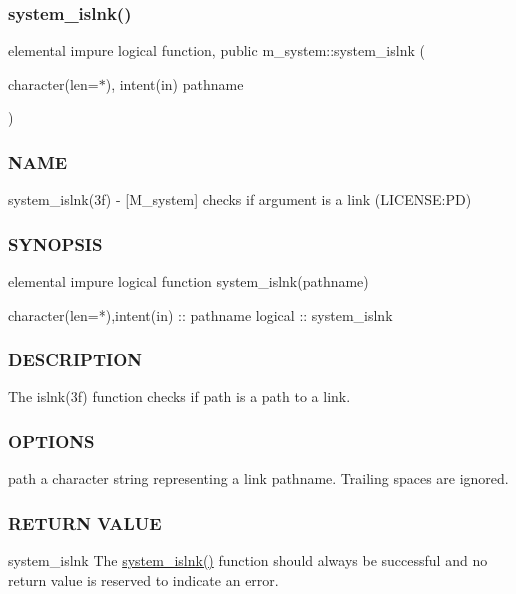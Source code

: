 \subsubsection{\texorpdfstring{system\+\_\+islnk()}{system\_islnk()}}
{\footnotesize\ttfamily elemental impure logical function, public m\+\_\+system\+::system\+\_\+islnk (\begin{DoxyParamCaption}\item[{character(len=$\ast$), intent(in)}]{pathname }\end{DoxyParamCaption})}



\subsubsection*{N\+A\+ME}

system\+\_\+islnk(3f) -\/ \mbox{[}M\+\_\+system\mbox{]} checks if argument is a link (L\+I\+C\+E\+N\+SE\+:PD) 

\subsubsection*{S\+Y\+N\+O\+P\+S\+IS}

\begin{DoxyVerb}elemental impure logical function system_islnk(pathname)

character(len=*),intent(in) :: pathname
logical                     :: system_islnk
\end{DoxyVerb}


\subsubsection*{D\+E\+S\+C\+R\+I\+P\+T\+I\+ON}

The islnk(3f) function checks if path is a path to a link.

\subsubsection*{O\+P\+T\+I\+O\+NS}

path a character string representing a link pathname. Trailing spaces are ignored.

\subsubsection*{R\+E\+T\+U\+RN V\+A\+L\+UE}

system\+\_\+islnk The \mbox{\hyperlink{namespacem__system_a268d0cd27be36527894fe2cae0f1b9f6}{system\+\_\+islnk()}} function should always be successful and no return value is reserved to indicate an error.

